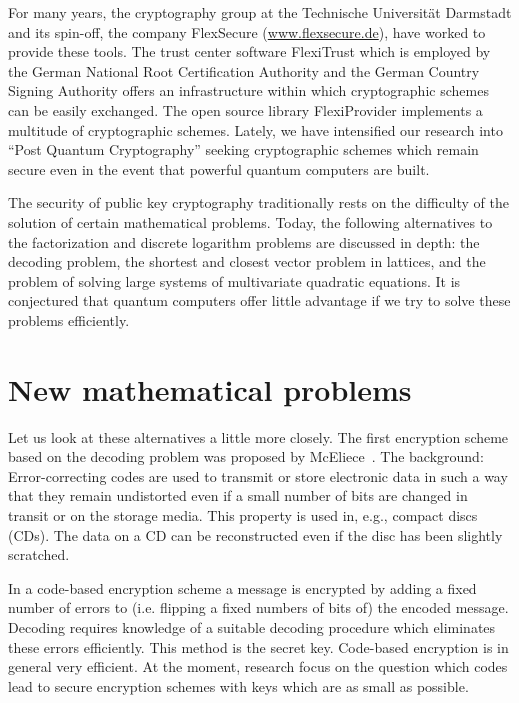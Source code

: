 For many years, the cryptography group at the
Technische Universit\"at Darmstadt and its spin-off,
the company FlexSecure (\url{www.flexsecure.de}),
have worked to provide these tools.  The
trust center software FlexiTrust which is employed
by the German National Root Certification
Authority and the German Country Signing Authority
offers an infrastructure within which
cryptographic schemes can be easily exchanged.
The open source library FlexiProvider implements a
multitude of cryptographic schemes.  Lately, we
have intensified our research into ``Post Quantum
Cryptography'' seeking
cryptographic schemes which
remain secure even in the event that powerful
quantum computers are built.

The security of public key cryptography
traditionally rests on the difficulty of the
solution of certain mathematical problems.  Today,
the following alternatives to the factorization and discrete
logarithm problems are discussed in depth:  the
decoding problem, the shortest and closest vector
problem in lattices, and the problem of solving
large systems of multivariate quadratic
equations.  It is conjectured that quantum
computers offer little advantage if we try to
solve these problems efficiently.


\section{New mathematical problems}
\label{sec:problems}

Let us look at these alternatives a little more
closely.  The first encryption scheme based on the
decoding problem was proposed by
McEliece~\cite{mceliece:1978}.  The background:
Error-correcting codes are used to transmit or
store electronic data in such a way that they
remain undistorted even if a small number of bits
are changed in transit or on the storage media.
This property is used in, e.g., compact discs
(CDs).  The data on a CD can be reconstructed even
if the disc has been slightly scratched.

In a code-based encryption scheme a message is
encrypted by adding a fixed number of errors to
(i.e. flipping a fixed numbers of bits of) the
encoded message.  Decoding requires knowledge of a
suitable decoding procedure which eliminates these
errors efficiently.  This method is the secret
key.  Code-based encryption is in general very
efficient.  At the moment, research focus on the
question which codes lead to secure encryption
schemes with keys which are as small as possible.

